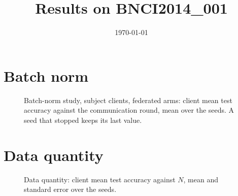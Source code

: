 \documentclass[a4paper]{article}
\title{Results on BNCI2014\_001}
\date{\today}
\begin{document}
\maketitle
\section{Batch norm}
\begin{table}[htbp]\centering
\caption{Batch-norm study: client mean test accuracy (\%), mean $\pm$ std over the seeds. Best mean of each row and network in bold.}
\resizebox{\ifdim\width>\linewidth\linewidth\else\width\fi}{!}{}
\end{table}
\begin{table}[htbp]\centering
\caption{Batch-norm study, SPDNet, subject clients: test accuracy of each subject (\%). Best mean of each row in bold.}
\resizebox{\ifdim\width>\linewidth\linewidth\else\width\fi}{!}{}
\end{table}
\begin{table}[htbp]\centering
\caption{Batch-norm study, EEGNet, subject clients: test accuracy of each subject (\%). Best mean of each row in bold.}
\resizebox{\ifdim\width>\linewidth\linewidth\else\width\fi}{!}{}
\end{table}
\begin{figure}[htbp]\centering

\caption{Batch-norm study, subject clients, federated arms: client mean test accuracy against the communication round, mean over the seeds. A seed that stopped keeps its last value.}
\end{figure}
\clearpage
\section{Data quantity}
\begin{table}[htbp]\centering
\caption{Data quantity (every subject has $N$ trials per class): client mean test accuracy (\%). Best mean of each column and block in bold.}
\resizebox{\ifdim\width>\linewidth\linewidth\else\width\fi}{!}{}
\end{table}
\begin{figure}[htbp]\centering

\caption{Data quantity: client mean test accuracy against $N$, mean and standard error over the seeds.}
\end{figure}
\clearpage
\end{document}
